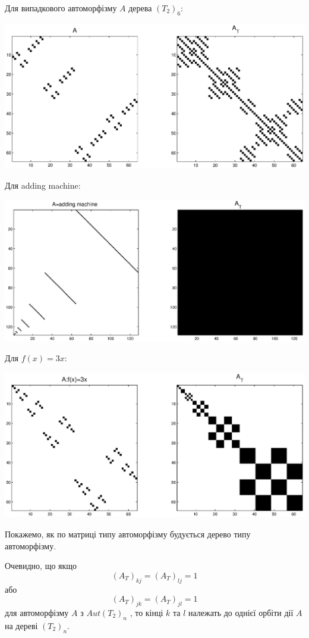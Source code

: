\documentclass[a4paper,12pt]{article} \usepackage{a4wide}
\numberwithin{equation}{subsection}
\begin{document}
Для випадкового автоморфізму $A$ дерева $(T_2)_6$:
\begin{center}
\includegraphics[scale=0.5]{matypetree.eps}
\end{center}
Для adding machine:
\begin{center}
\includegraphics[scale=0.5]{matypetreeAM.eps}
\end{center}
Для $f(x)=3x$:
\begin{center}
\includegraphics[scale=0.5]{matypetree3x.eps}
\end{center}
Покажемо, як по матриці типу автоморфізму будується дерево типу автоморфізму.

 Очевидно, що якщо $$(A_T)_{kj}=(A_T)_{lj}=1$$ або $$(A_T)_{jk}=(A_T)_{jl}=1$$ для автоморфізму $A$ з $Aut(T_2)_n$ ,
  то кінці $k$ та $l$ належать до однієї орбіти дії $A$ на дереві $(T_2)_n$.
\end{document}
